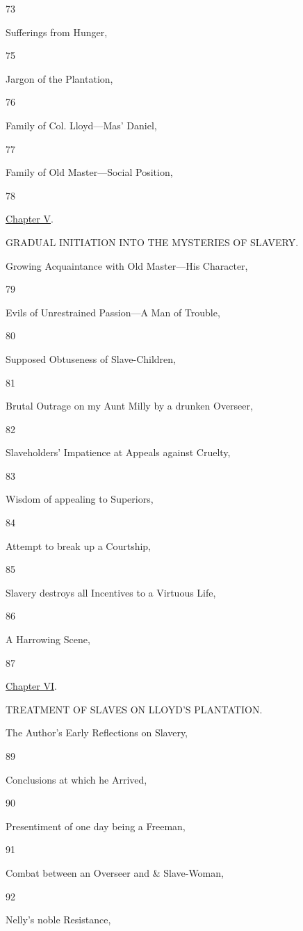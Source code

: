 73

Sufferings from Hunger,

75

Jargon of the Plantation,

76

Family of Col. Lloyd---Mas' Daniel,

77

Family of Old Master---Social Position,

78

\href{/wiki/My_Bondage_and_My_Freedom_(1855)/Chapter_V}{Chapter V}.

GRADUAL INITIATION INTO THE MYSTERIES OF SLAVERY.

Growing Acquaintance with Old Master---His Character,

79

Evils of Unrestrained Passion---A Man of Trouble,

80

Supposed Obtuseness of Slave-Children,

81

Brutal Outrage on my Aunt Milly by a drunken Overseer,

82

Slaveholders' Impatience at Appeals against Cruelty,

83

Wisdom of appealing to Superiors,

84

Attempt to break up a Courtship,

85

Slavery destroys all Incentives to a Virtuous Life,

86

A Harrowing Scene,

87

\href{/wiki/My_Bondage_and_My_Freedom_(1855)/Chapter_VI}{Chapter VI}.

TREATMENT OF SLAVES ON LLOYD'S PLANTATION.

The Author's Early Reflections on Slavery,

89

Conclusions at which he Arrived,

90

Presentiment of one day being a Freeman,

91

Combat between an Overseer and \& Slave-Woman,

92

Nelly's noble Resistance,

